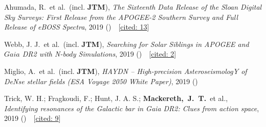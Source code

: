 \item[{\scriptsize4}]Ahumada, R.~et al.~(incl. \textbf{JTM}), \textit{The Sixteenth Data Release of the Sloan Digital Sky Surveys: First Release from the APOGEE-2 Southern Survey and Full Release of eBOSS Spectra}, 2019 ()~~{\footnotesize[\href{http://adsabs.harvard.edu/abs/2019arXiv191202905A}{cited: 13}]}

\item[{\scriptsize3}]Webb, J. J.~et al.~(incl. \textbf{JTM}), \textit{Searching for Solar Siblings in APOGEE and $Gaia$ DR2 with N-body Simulations}, 2019 ()~~{\footnotesize[\href{http://adsabs.harvard.edu/abs/2019arXiv191001646W}{cited: 2}]}

\item[{\scriptsize2}]Miglio, A.~et al.~(incl. \textbf{JTM}), \textit{HAYDN -- High-precision AsteroseismologY of DeNse stellar fields (ESA Voyage 2050 White Paper)}, 2019 ()

\item[{\scriptsize1}]Trick, W. H.; Fragkoudi, F.; Hunt, J. A. S.; \textbf{Mackereth,~J.~T.}~et al., \textit{Identifying resonances of the Galactic bar in Gaia DR2: Clues from action space}, 2019 ()~~{\footnotesize[\href{http://adsabs.harvard.edu/abs/2019arXiv190604786T}{cited: 9}]}